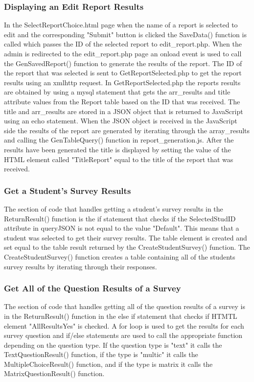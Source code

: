 \documentclass[../final.tex]{subfiles}
\begin{document}
	\subsubsection{Displaying an Edit Report Results}
	In the SelectReportChoice.html page when the name of a report is selected to edit and the corresponding "Submit" button is clicked the SaveData() function is called which passes the ID of the selected report to edit\_report.php. When the admin is redirected to the edit\_report.php page an onload event is used to call the GenSavedReport() function to generate the results of the report. The ID of the report that was selected is sent to GetReportSelected.php to get the report results using an xmlhttp request. In GetReportSelected.php the reports results are obtained by using a mysql statement that gets the arr\_results and title attribute values from the Report table based on the ID that was received. The title and arr\_results are stored in a JSON object that is returned to JavaScript using an echo statement. When the JSON object is received in the JavaScript side the results of the report are generated by iterating through the array\_results and calling the GenTableQuery() function in report\_generation.js. After the results have been generated the title is displayed by setting the value of the HTML element called "TitleReport" equal to the title of the report that was received. 
	
	\subsubsection{Get a Student's Survey Results}
	The section of code that handles getting a student's survey results in the ReturnResult() function is the if statement that checks if the SelectedStudID attribute in queryJSON is not equal to the value "Default". This means that a student was selected to get their survey results. The table element is created and set equal to the table result returned by the CreateStudentSurvey() function. The CreateStudentSurvey() function creates a table containing all of the students survey results by iterating through their responses.
	
	\subsubsection{Get All of the Question Results of a Survey}
	The section of code that handles getting all of the question results of a survey is in the ReturnResult() function in the else if statement that checks if HTMTL element "AllResultsYes" is checked. A for loop is used to get the results for each survey question and if/else statements are used to call the appropriate function depending on the question type. If the question type is "text" it calls the TextQuestionResult() function, if the type is "multic" it calls the MultipleChoiceResult() function, and if the type is matrix it calls the MatrixQuestionResult() function. 
		
\end{document}
